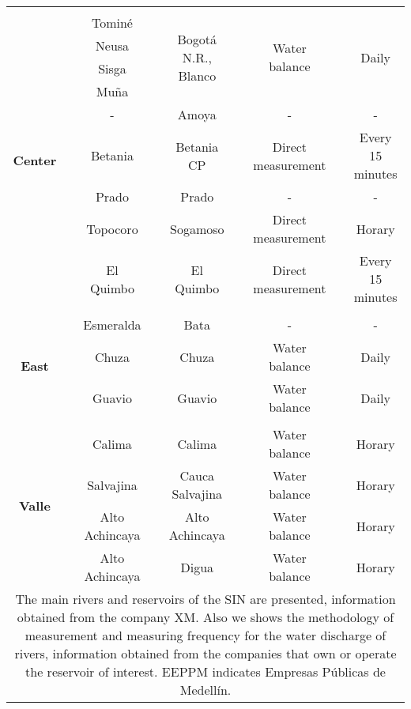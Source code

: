 \documentclass[12pt,halfline,a4paper]{ouparticle}
\begin{document}
\begin{table}[htbp]
{\begin{tabular}{ccccccccc}
			\hdashline
			&       &       &       &       &       &       &       &  \\
			\multirow{9}[0]{*}{\textbf{Center}} &       & Tominé  &       & \multirow{4}[0]{*}{Bogotá N.R., Blanco } &       & \multirow{4}[0]{*}{Water balance} &       & \multirow{4}[0]{*}{Daily} \\
			&       & Neusa &       &       &       &       &       &  \\
			&       & Sisga  &       &       &       &       &       &  \\
			&       & Muña  &       &       &       &       &       &  \\
			&       & -     &       & Amoya &       & -     &       & - \\
			&       & Betania &       & Betania CP &       & Direct measurement  &       & Every 15 minutes \\
			&       & Prado &       & Prado &       & -     &       & - \\
			&       & Topocoro &       & Sogamoso &       & Direct measurement &       & Horary  \\
			&       & El Quimbo &       & El Quimbo  &       & Direct measurement &       & Every 15 minutes \\
			\hdashline
			&       &       &       &       &       &       &       &  \\
			\multirow{3}[0]{*}{\textbf{East}} &       & Esmeralda &       & Bata  &       & -     &       & - \\
			&       & Chuza &       & Chuza &       & Water balance &       & Daily \\
			&       & Guavio &       & Guavio &       & Water balance &       & Daily \\
			\hdashline
			&       &       &       &       &       &       &       &  \\
			\multirow{4}[1]{*}{\textbf{Valle}} &       & Calima  &       & Calima &       & Water balance &       & Horary \\
			&       & Salvajina &       & Cauca Salvajina &       & Water balance &       & Horary \\
			&       & Alto Achincaya &       & Alto Achincaya &       & Water balance &       & Horary \\
			&       & Alto Achincaya &       & Digua &       & Water balance &       & Horary \\
			\bottomrule
			\bottomrule
			\multicolumn{9}{p{20cm}}{\footnotesize{The main rivers and reservoirs of the SIN are presented, information obtained from the company XM. Also we shows the methodology of measurement and measuring frequency for the water discharge of rivers, information obtained from the companies that own or operate the reservoir of interest. EEPPM indicates Empresas Públicas de Medellín.}}
	\end{tabular}}
	\label{tab:hidros}
\end{table}
\end{document}
